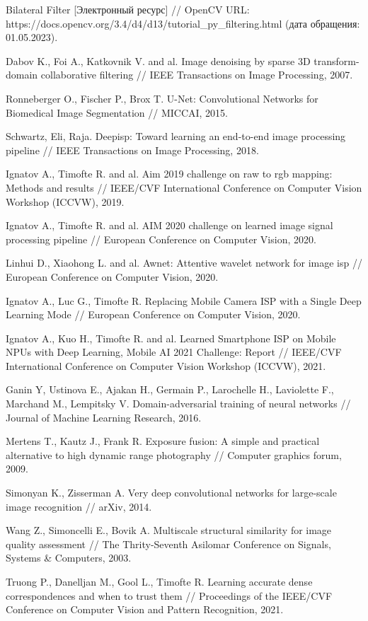 \begin{thebibliography}{00}
    Bilateral Filter
    [Электронный ресурс] //
    OpenCV
    URL: https://docs.opencv.org/3.4/d4/d13/tutorial\_py\_filtering.html
    (дата обращения: 01.05.2023).

    Dabov K., Foi A., Katkovnik V. and al.
    Image denoising by sparse 3D transform-domain collaborative filtering //
    IEEE Transactions on Image Processing, 2007.

    Ronneberger O., Fischer P., Brox T.
    U-Net: Convolutional Networks for Biomedical Image Segmentation //
    MICCAI, 2015.

    Schwartz, Eli, Raja.
    Deepisp: Toward learning an end-to-end image processing pipeline //
    IEEE Transactions on Image Processing, 2018.

    Ignatov A., Timofte R. and al.
    Aim 2019 challenge on raw to rgb mapping: Methods and results //
    IEEE/CVF International Conference on Computer Vision Workshop (ICCVW), 2019.

    Ignatov A., Timofte R. and al.
    AIM 2020 challenge on learned image signal processing pipeline //
    European Conference on Computer Vision, 2020.

    Linhui D., Xiaohong L. and al.
    Awnet: Attentive wavelet network for image isp //
    European Conference on Computer Vision, 2020.

    Ignatov A., Luc G., Timofte R.
    Replacing Mobile Camera ISP with a Single Deep Learning Mode //
    European Conference on Computer Vision, 2020.

    Ignatov A., Kuo H., Timofte R. and al.
    Learned Smartphone ISP on Mobile NPUs with Deep Learning, Mobile AI 2021 Challenge: Report //
    IEEE/CVF International Conference on Computer Vision Workshop (ICCVW), 2021.

    Ganin Y, Ustinova E., Ajakan H., Germain P., Larochelle H., Laviolette F., Marchand M., Lempitsky V.
    Domain-adversarial training of neural networks //
    Journal of Machine Learning Research, 2016.

    Mertens T., Kautz J., Frank R.
    Exposure fusion: A simple and practical alternative to high dynamic range photography //
    Computer graphics forum, 2009.

    Simonyan K., Zisserman A. 
    Very deep convolutional networks for large-scale image recognition //
    arXiv, 2014.

    Wang Z., Simoncelli E., Bovik A. 
    Multiscale structural similarity for image quality assessment //
    The Thrity-Seventh Asilomar Conference on Signals, Systems \& Computers, 2003. 

    Truong P., Danelljan M., Gool L., Timofte R.
    Learning accurate dense correspondences and when to trust them //
    Proceedings of the IEEE/CVF Conference on Computer Vision and Pattern Recognition, 2021.

\end{thebibliography}
\endgroup

\clearpage